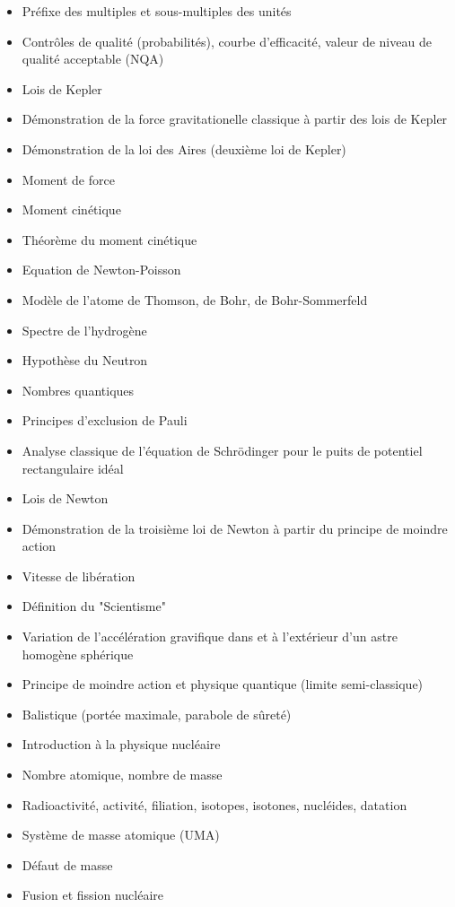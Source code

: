 \documentclass[12pt,a4paper,twoside,openright]{report}
\theoremstyle{definition}
\theoremstyle{itexmp}
\numberwithin{equation}{section}
\begin{document}
\begin{itemize}
\begin{itemize}[noitemsep]
				\item Préfixe des multiples et sous-multiples des unités
				\item Contrôles de qualité (probabilités), courbe d'efficacité, valeur de niveau de qualité acceptable (NQA)
				\item Lois de Kepler
				\item Démonstration de la force gravitationelle classique à partir des lois de Kepler
				\item Démonstration de la loi des Aires (deuxième loi de Kepler)
				\item Moment de force
				\item Moment cinétique
				\item Théorème du moment cinétique
				\item Equation de Newton-Poisson
				\item Modèle de l'atome de Thomson, de Bohr, de Bohr-Sommerfeld
				\item Spectre de l'hydrogène
				\item Hypothèse du Neutron
				\item Nombres quantiques
				\item Principes d'exclusion de Pauli
				\item Analyse classique de l'équation de Schrödinger pour le puits de potentiel rectangulaire idéal
				\item Lois de Newton
				\item Démonstration de la troisième loi de Newton à partir du principe de moindre action
				\item Vitesse de libération
				\item Définition du "Scientisme"
				\item Variation de l'accélération gravifique dans et à l'extérieur d'un astre homogène sphérique
				\item Principe de moindre action et physique quantique (limite semi-classique)
				\item Balistique (portée maximale, parabole de sûreté)
				\item Introduction à la physique nucléaire
				\item Nombre atomique, nombre de masse
				\item Radioactivité, activité, filiation, isotopes, isotones, nucléides, datation
				\item Système de masse atomique (UMA)
				\item Défaut de masse
				\item Fusion et fission nucléaire

\end{itemize}
\end{itemize}
\end{document}
